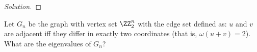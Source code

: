 \documentclass[11pt]{scrartcl}
\begin{document}
\begin{proof}[Solution]

\end{proof}
\begin{problem}
    Let $G_n$ be the graph with vertex set $\ZZ_2^n$ with the edge set defined as: $u$ and $v$ are adjacent iff they differ in exactly two coordinates (that is, $\omega(u+v)=2$). What are the eigenvalues of $G_n$?
    
\end{problem}
\end{document}
